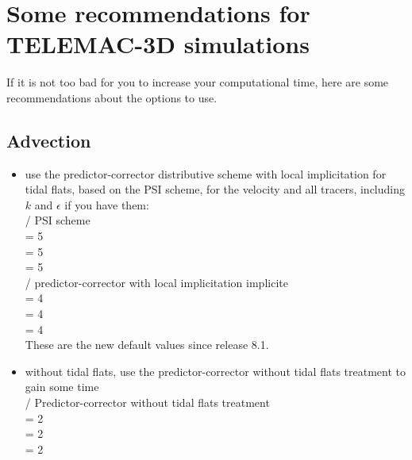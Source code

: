 \chapter{Some recommendations for TELEMAC-3D simulations}

If it is not too bad for you to increase your computational time,
here are some recommendations about the options to use.

\section{Advection}
\begin{itemize}
\item use the predictor-corrector distributive scheme with local implicitation for tidal flats,
based on the PSI scheme, for the velocity and all tracers, including $k$ and $\epsilon$
if you have them:\\
  / PSI scheme\\
   = 5\\
   = 5\\
   = 5\\
  / predictor-corrector with local implicitation implicite\\
   = 4\\
   = 4\\
   = 4\\
These are the new default values since release 8.1.\\
\item without tidal flats, use the predictor-corrector without tidal flats treatment to gain some time\\
  / Predictor-corrector without tidal flats treatment\\
   = 2\\
   = 2\\
   = 2\\
\end{itemize}
